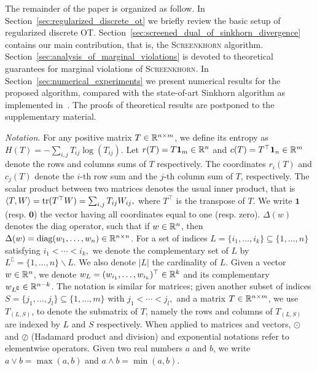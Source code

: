
The remainder of the paper is organized as follow. In Section~\ref{sec:regularized_discrete_ot} we briefly review the basic setup of regularized discrete OT. 
Section~\ref{sec:screened_dual_of_sinkhorn_divergence} contains our main contribution, that is, the \textsc{Screenkhorn} algorithm. 
Section~\ref{sec:analysis_of_marginal_violations} is devoted to theoretical guarantees for marginal violations of \textsc{Screenkhorn}. 
In Section~\ref{sec:numerical_experiments} we present numerical results for the proposed algorithm, compared with the state-of-art Sinkhorn algorithm as implemented in~\cite{flamary2017pot}. 
The proofs of theoretical results are postponed to the supplementary material.

\emph{Notation.} For any positive matrix $T \in {\mathbb{R}}^{n\times m}$, we define its entropy as $H(T) = -\sum_{i,j} T_{ij} \log(T_{ij}).$
Let $r(T) = T\mathbf 1_m \in {\mathbb{R}}^n$ and $c(T) = T^\top\mathbf 1_n \in {\mathbb{R}}^m$ denote the rows and columns sums of $T$ respectively. The coordinates $r_i(T)$ and $c_j(T)$ denote the $i$-th row sum and the $j$-th column sum of $T$, respectively.
The scalar product between two matrices denotes the usual inner product, that is $\langle T, W \rangle = \text{tr}(T^\top W) = \sum_{i,j}T_{ij}W_{ij},$ where $T^\top$ is the transpose of $T$. 
We write $\mathbf{1}$ (resp. $\mathbf{0}$) the vector having all coordinates equal to one (resp. zero).
$\Delta(w)$ denotes the diag operator, such that if $w \in {\mathbb{R}}^n$, then $\Delta(w) = \text{diag}(w_1, \ldots, w_n)\in {\mathbb{R}}^{n\times n}$.
For a set of indices $L=\{i_1, \ldots, i_k\} \subseteq \{1, \ldots, n\}$ satisfying $i_1 < \cdots <i_k,$ we denote the complementary set of $L$ by $L^\complement = \{1, \ldots, n\} \backslash L$. We also denote $|L|$ the cardinality of $L$.
Given a vector $w \in {\mathbb{R}}^n$, we denote $w_L= (w_{i_1}, \ldots, w_{i_k})^\top \in {\mathbb{R}}^k$ and its complementary $w_{L^\complement} \in {\mathbb{R}}^{n- k}$.  The notation is similar for matrices; given another subset of indices $S = \{j_1, \ldots, j_l\} \subseteq \{1, \ldots, m\}$ with $j_1 < \cdots <j_l,$ and a matrix $T\in {\mathbb{R}}^{n\times m}$, we use $T_{(L,S)}$, to denote the submatrix of $T$, namely the rows and columns of $T_{(L,S)}$ are indexed by $L$ and $S$ respectively.
When applied to matrices and vectors,  $\odot$ and $\oslash$ (Hadamard product and division) and exponential notations refer to elementwise operators.
Given two real numbers $a$ and $b$, we write $a\vee b = \max(a,b)$ and $a\wedge b = \min(a,b).$

